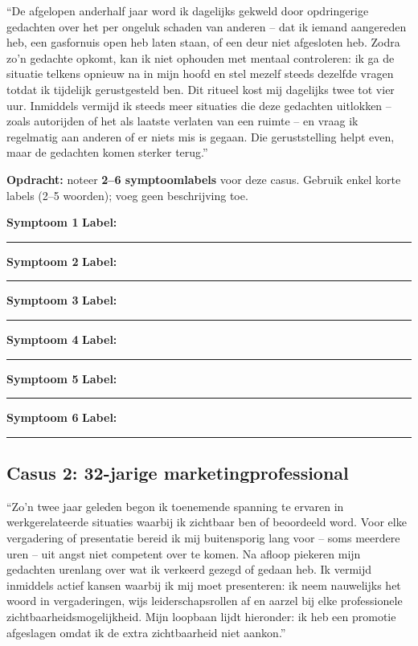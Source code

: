 \documentclass[11pt,a4paper]{article}
\newcommand{\symptoomslot}[1]{%
\vspace{0.25em}\noindent
\begin{tcolorbox}[colback=SoftBG,colframe=BorderGrey,boxrule=0.4pt,arc=1.5mm,left=8pt,right=8pt,top=5pt,bottom=5pt]%
\small\textbf{\color{SlateMid}Symptoom #1}\hspace{1em}%
\textbf{Label:}\hspace{0.5em}\rule{0.56\linewidth}{0.25pt}%
\end{tcolorbox}%
}
\begin{document}
\begin{complaintbox}[title={Casus 1: 25-jarige postgraduaatsstudent; duur: 18 maanden}]
\small ``De afgelopen anderhalf jaar word ik dagelijks gekweld door opdringerige gedachten over het per ongeluk schaden van anderen -- dat ik iemand aangereden heb, een gasfornuis open heb laten staan, of een deur niet afgesloten heb. Zodra zo'n gedachte opkomt, kan ik niet ophouden met mentaal controleren: ik ga de situatie telkens opnieuw na in mijn hoofd en stel mezelf steeds dezelfde vragen totdat ik tijdelijk gerustgesteld ben. Dit ritueel kost mij dagelijks twee tot vier uur. Inmiddels vermijd ik steeds meer situaties die deze gedachten uitlokken -- zoals autorijden of het als laatste verlaten van een ruimte -- en vraag ik regelmatig aan anderen of er niets mis is gegaan. Die geruststelling helpt even, maar de gedachten komen sterker terug.''
\end{complaintbox}

\begin{responsebox}
\small\textbf{Opdracht:} noteer \textbf{2--6 symptoomlabels} voor deze casus.
Gebruik enkel korte labels (2--5 woorden); voeg geen beschrijving toe.

\symptoomslot{1}
\symptoomslot{2}
\symptoomslot{3}
\symptoomslot{4}
\symptoomslot{5}
\symptoomslot{6}
\end{responsebox}

\vspace{0.6em}

\newpage

\subsection*{Casus 2: 32-jarige marketingprofessional}

\begin{complaintbox}[title={Casus 2: 32-jarige marketingprofessional; duur: 2 jaar}]
\small ``Zo'n twee jaar geleden begon ik toenemende spanning te ervaren in werkgerelateerde situaties waarbij ik zichtbaar ben of beoordeeld word. Voor elke vergadering of presentatie bereid ik mij buitensporig lang voor -- soms meerdere uren -- uit angst niet competent over te komen. Na afloop piekeren mijn gedachten urenlang over wat ik verkeerd gezegd of gedaan heb. Ik vermijd inmiddels actief kansen waarbij ik mij moet presenteren: ik neem nauwelijks het woord in vergaderingen, wijs leiderschapsrollen af en aarzel bij elke professionele zichtbaarheidsmogelijkheid. Mijn loopbaan lijdt hieronder: ik heb een promotie afgeslagen omdat ik de extra zichtbaarheid niet aankon.''
\end{complaintbox}
\end{document}
